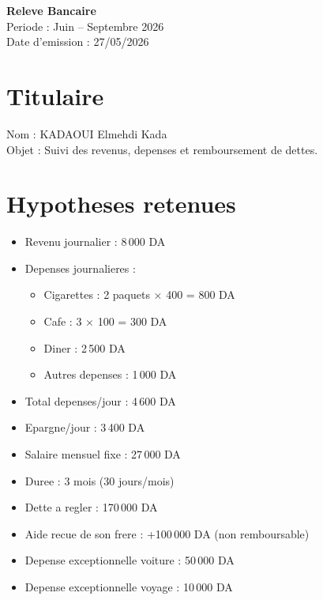 \documentclass[11pt,a4paper]{article}
\begin{document}
\begin{center}
{\LARGE \textbf{Releve Bancaire}}\\[4pt]
{\large Periode : Juin -- Septembre 2026}\\[2pt]
Date d'emission : 27/05/2026
\end{center}

\vspace{0.4cm}

\section*{Titulaire}
Nom : KADAOUI Elmehdi Kada\\
Objet : Suivi des revenus, depenses et remboursement de dettes.

\section*{Hypotheses retenues}
\begin{itemize}
  \item Revenu journalier : 8\,000 DA
  \item Depenses journalieres :
  \begin{itemize}
    \item Cigarettes : 2 paquets $\times$ 400 = 800 DA
    \item Cafe : 3 $\times$ 100 = 300 DA
    \item Diner : 2\,500 DA
    \item Autres depenses : 1\,000 DA
  \end{itemize}
  \item Total depenses/jour : 4\,600 DA
  \item Epargne/jour : 3\,400 DA
  \item Salaire mensuel fixe : 27\,000 DA
  \item Duree : 3 mois (30 jours/mois)
  \item Dette a regler : 170\,000 DA
  \item Aide recue de son frere : +100\,000 DA (non remboursable)
  \item Depense exceptionnelle voiture : 50\,000 DA
  \item Depense exceptionnelle voyage : 10\,000 DA
\end{itemize}
\end{document}
